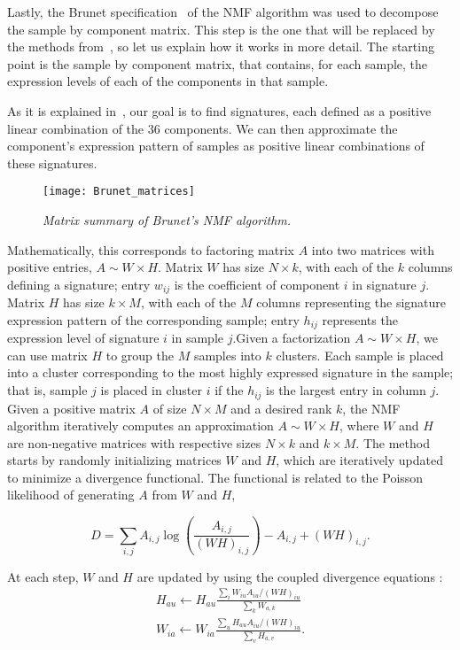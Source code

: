 \documentclass[a4paper]{article}
\begin{document}
Lastly, the Brunet specification~\cite{Brunet} of the NMF algorithm was used to decompose the sample by component matrix. This step is the one that will be replaced by the methods from~\cite{Shira}, so let us explain how it works in more detail. The starting point is the sample by component matrix, that contains, for each sample, the expression levels of each of the components in that sample. 

As it is explained in~\cite{Brunet}, our goal is to find signatures, each defined as a positive linear combination of the 36 components. We can then approximate the component's expression pattern of samples as positive linear combinations of these signatures.

\begin{figure}[h] 
	\centering
	\texttt{[image: Brunet\_matrices]} 
	\caption{\textit{Matrix summary of Brunet's NMF algorithm.}} \label{Brunmax}
\end{figure}

Mathematically, this corresponds to factoring matrix $A$ into two matrices with positive entries, $A \sim W\times H$. Matrix $W$ has size $N \times k$, with each of the $k$ columns defining a signature; entry $w_{ij}$ is the coefficient of component $i$ in signature $j$. Matrix $H$ has size $k \times M$, with each of the $M$ columns representing the signature expression pattern of the corresponding sample; entry $h_{ij}$ represents the expression level of signature $i$ in sample $j$.Given a factorization $A \sim W\times H$, we can use matrix $H$ to group the $M$ samples into $k$ clusters. Each sample is placed into a cluster corresponding to the most highly expressed signature in the sample; that is, sample $j$ is placed in cluster $i$ if the $h_{ij}$ is the largest entry in column $j$.
Given a positive matrix $A$ of size $N\times M$ and a desired rank $k$, the NMF algorithm iteratively computes an approximation $A \sim W\times H$, where $W$ and $H$ are non-negative matrices with respective sizes $N \times k$ and $k \times M$. The method starts by randomly initializing matrices $W$ and $H$, which are iteratively updated to minimize a divergence functional. The functional is related to the Poisson likelihood of generating $A$ from $W$ and $H$,

\begin{equation*}
D = \sum_{i,j} A_{i,j} \log\left(\frac{A_{i,j}} {(WH)_{i,j}}\right)-A_{i,j} + (WH)_{i,j}.
\end{equation*}

At each step, $W$ and $H$ are updated by using the coupled divergence equations :
\begin{align*}
H_{au} \leftarrow H_{au} \frac{\sum_{i}W_{iu}A_{iu}/(WH)_{iu}}{\sum_{k}W_{a,k} }\\
W_{ia} \leftarrow W_{ia} \frac{\sum_{u}H_{au}A_{iu}/(WH)_{iu}}{\sum_{v}H_{a,v}}.
\end{align*}
\end{document}
